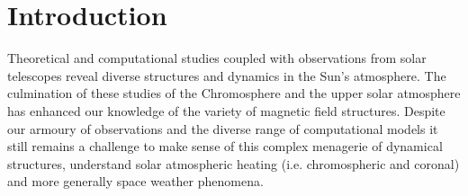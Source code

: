 \documentclass[linenumbers]{aastex63}
\begin{document}


\section{Introduction} \label{sec:intro}


Theoretical and computational studies coupled with observations from solar telescopes reveal diverse structures and dynamics in the Sun's atmosphere. The culmination of these studies of the Chromosphere and the upper solar atmosphere has enhanced our knowledge of the variety of magnetic field structures.  Despite our armoury of observations and the diverse range of computational models it still remains a challenge to make sense of this complex menagerie of dynamical structures, understand solar atmospheric heating (i.e. chromospheric and coronal) and more generally space weather phenomena.
\end{document}
